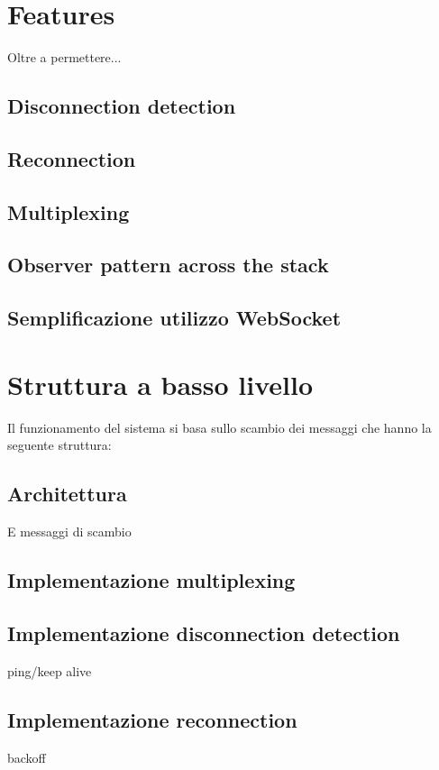 \documentclass[12pt,a4paper,openright]{report}
\begin{document}
\section{Features}\label{sec_features}
Oltre a permettere...
\subsection{Disconnection detection}

\subsection{Reconnection}

\subsection{Multiplexing}

\subsection{Observer pattern across the stack}

\subsection{Semplificazione utilizzo WebSocket}

\section{Struttura a basso livello}\label{sec_struttura_basso_livello}
Il funzionamento del sistema si basa sullo scambio dei messaggi che hanno la seguente struttura:
\subsection{Architettura}
E messaggi di scambio

\subsection{Implementazione multiplexing}

\subsection{Implementazione disconnection detection}
ping/keep alive
\subsection{Implementazione reconnection}
backoff
\end{document}
